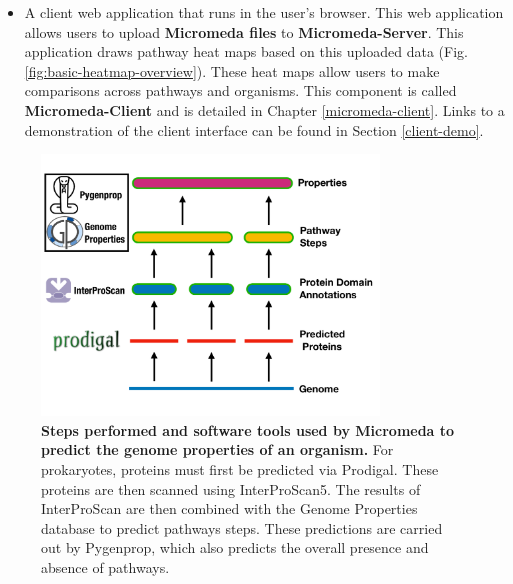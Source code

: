\begin{itemize}
\item A client web application that runs in the user's browser. This web 
application allows users to upload \textbf{Micromeda files} to 
\textbf{Micromeda-Server}. This application draws pathway heat maps based on 
this uploaded data  (Fig. \ref{fig:basic-heatmap-overview}). These heat maps 
allow users to make comparisons across pathways and organisms. This component is 
called \textbf{Micromeda-Client} and is detailed in Chapter 
\ref{micromeda-client}. Links to a demonstration of the client interface can be 
found in Section \ref{client-demo}.
\end{itemize}

\begin{figure}[!ht]
  \centering
	\includegraphics[width=0.8\textwidth]{media/micromeda-pipeline.pdf}
	 \caption[Steps performed and software tools used by Micromeda to predict the 
genome properties of an organism.]{\textbf{Steps performed and software tools 
used by Micromeda to predict the genome properties of an organism.} For 
prokaryotes, proteins must first be predicted via Prodigal. These proteins are 
then scanned using InterProScan5. The results of InterProScan are then combined 
with the Genome Properties database to predict pathways steps. These predictions 
are carried out by Pygenprop, which also predicts the overall presence and 
absence of pathways.}
	 \label{fig:micromeda-levels}
\end{figure}

